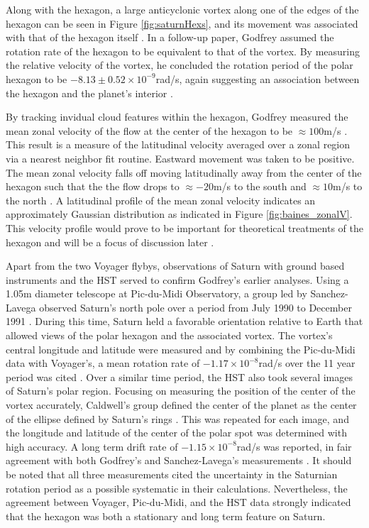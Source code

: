 \documentclass[preprint]{revtex4-1} %
\begin{document}
Along with the hexagon, a large anticyclonic vortex along one of the
edges of the hexagon can be seen in Figure \ref{fig:saturnHexs}, and
its movement was associated with that of the hexagon itself
\cite{Godfrey1988, MoralesJuberias2011}.  In a follow-up paper, Godfrey assumed the
rotation rate of the hexagon to be equivalent to that of the vortex.
By measuring the relative velocity of the vortex, he concluded the
rotation period of the polar hexagon to be $-8.13 \pm 0.52 \times
10^{-9}$rad/s, again suggesting an association between the hexagon
and the planet's interior \cite{Godfrey1990}.

By tracking invidual cloud features within the hexagon, Godfrey
measured the mean zonal velocity of the flow at the center of the hexagon to be
$\approx 100$m/s \cite{Godfrey1988}.  This result is a measure of the
latitudinal velocity averaged over a zonal region via a nearest
neighbor fit routine. Eastward movement was taken to be positive.  The
mean zonal velocity falls off 
moving latitudinally away from the center of the hexagon such that the
the flow drops to $\approx -20$m/s to the south and $\approx 10$m/s to
the north \cite{Godfrey1988}.  A latitudinal profile of the mean zonal
velocity indicates an approximately Gaussian distribution as indicated
in Figure \ref{fig:baines_zonalV}.  This
velocity profile would prove to be important for theoretical
treatments of the hexagon and will be a focus of discussion later
\cite{BarbosaAguiar2010, Allison1990, MoralesJuberias2011}.

Apart from the two Voyager flybys, observations of Saturn with ground
based instruments and the HST served to confirm Godfrey's earlier
analyses.  Using a 1.05m diameter telescope at Pic-du-Midi
Observatory, a group led by Sanchez-Lavega observed Saturn's north
pole over a period from July 1990 to December 1991
\cite{SanchezLavega1993}.  During this time, Saturn held a favorable
orientation relative to Earth that allowed views of the polar hexagon
and the associated vortex.  The vortex's central longitude and latitude were
measured and by combining the Pic-du-Midi data with Voyager's, a mean
rotation rate of $-1.17 \times 10^{-8}$rad/s over the 11 year period was cited \cite{SanchezLavega1993}.  Over a similar time period, the HST
also took several images of Saturn's polar region.  Focusing on
measuring the position of the center of the vortex accurately,
Caldwell's group defined the center of the planet as the center of the
ellipse defined by Saturn's rings \cite{Caldwell1993}.  This was
repeated for each image, and the longitude and latitude of the center
of the polar spot was determined with high accuracy.  A long term
drift rate of $-1.15 \times 10^{-8}$rad/s was reported, in fair
agreement with both Godfrey's and Sanchez-Lavega's measurements
\cite{Caldwell1993}.  It should be noted that all three
measurements cited the uncertainty in the Saturnian rotation
period as a possible systematic in their calculations.  Nevertheless,
the agreement between Voyager, Pic-du-Midi, and the HST data strongly
indicated that the hexagon was both a stationary and long term feature
on Saturn.
\end{document}
